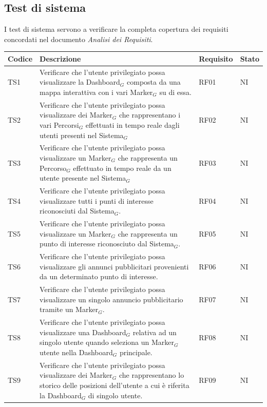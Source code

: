 \documentclass[10pt]{article}
\begin{document}
\begin{justify}
\subsection{Test di sistema}
I test di sistema servono a verificare la completa copertura dei requisiti concordati nel documento \textit{Analisi dei Requisiti}.\\

\begin{longtable}{|>{\centering\arraybackslash}m{2cm}|>{\centering\arraybackslash}m{7cm}|>{\centering\arraybackslash}m{2cm}|>{\centering\arraybackslash}m{2cm}|}
\hline
\textbf{Codice} & \textbf{Descrizione} & \textbf{Requisito} & \textbf{Stato}\\
\endhead
\hline
TS1 & Verificare che l'utente privilegiato possa visualizzare la Dashboard$_G$ composta da una mappa interattiva con i vari Marker$_G$ su di essa. & RF01 & NI \\
\hline
TS2 & Verificare che l'utente privilegiato possa visualizzare dei Marker$_G$ che rappresentano i vari Percorsi$_G$ effettuati in tempo reale dagli utenti presenti nel Sistema$_G$ & RF02 & NI \\
\hline
TS3 & Verificare che l'utente privilegiato possa visualizzare un Marker$_G$ che rappresenta un Percorso$_G$ effettuato in tempo reale da un utente presente nel Sistema$_G$ & RF03 & NI \\
\hline
TS4 & Verificare che l'utente privilegiato possa visualizzare tutti i punti di interesse riconosciuti dal Sistema$_G$. & RF04 & NI \\
\hline
TS5 & Verificare che l'utente privilegiato possa visualizzare un Marker$_G$ che rappresenta un punto di interesse riconosciuto dal Sistema$_G$. & RF05 & NI \\
\hline
TS6 & Verificare che l'utente privilegiato possa visualizzare gli annunci pubblicitari provenienti da un determinato punto di interesse. & RF06 & NI \\
\hline
TS7 & Verificare che l'utente privilegiato possa visualizzare un singolo annuncio pubblicitario tramite un Marker$_G$. & RF07 & NI \\
\hline
TS8 & Verificare che l'utente privilegiato possa visualizzare una Dashboard$_G$ relativa ad un singolo utente quando seleziona un Marker$_G$ utente nella Dashboard$_G$ principale. & RF08 & NI \\
\hline
TS9 & Verificare che l'utente privilegiato possa visualizzare dei Marker$_G$ che rappresentano lo storico delle posizioni dell'utente a cui è riferita la Dashboard$_G$ di singolo utente. & RF09 & NI \\

\end{longtable}
\end{justify}
\end{document}
